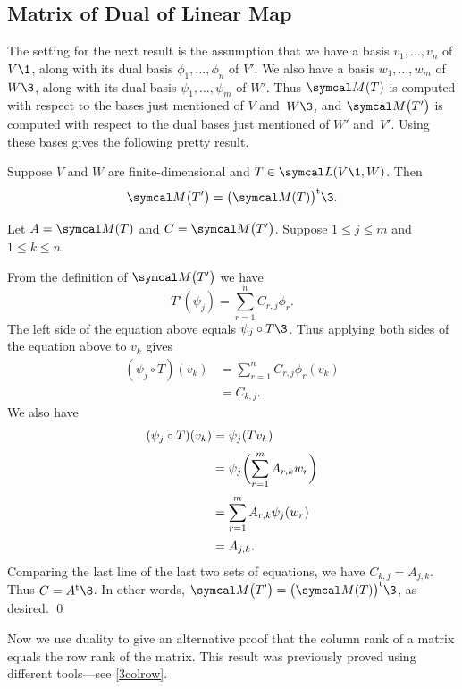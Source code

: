 \subsection{Matrix of Dual of Linear Map}

The setting for the next result is the assumption that we have a basis $v_1, \dots, v_n$ of $V\1$, along with its dual basis $\phi_1, \dots, \phi_n$ of $V'\!$. We also have a basis $w_1, \dots, w_m$ of $W\3$, along with its dual basis $\psi_1, \dots, \psi_m$ of $W'\!$. Thus $\M(T)$ is computed with respect to the bases just mentioned of $V$ and~$W\3$, and $\M\paren[\big]{T'}$ is computed with respect to the dual bases just mentioned of $W'$ and~$V'\!$. Using these bases gives the following pretty result.

{Suppose $V$ and $W$ are finite-dimensional and $T \in \L(V\1, W)$. Then
\[
\M\paren[\big]{T'} = \tran{\bigl(\M(T)\bigr)}\3.
\]}

\proof
Let $A = \M(T)$ and $C = \M\paren[\big]{T'}$. Suppose $1 \le j \le m$ and $1 \le k \le n$.

From the definition of $\M\paren[\big]{T'}$ we have
\[
T' \! (\psi_j) = \sum_{r=1}^n C_{r,j} \phi_r.
\]
The left side of the equation above equals $\psi_j \circ T\3$. Thus applying both sides of the equation above to $v_k$ gives
\begin{align*}
(\psi_j \circ T)(v_k) &= \sum_{r=1}^n C_{r,j} \phi_r(v_k)\\[2bp]
&= C_{k,j}.
\end{align*}
We also have
\begin{align*}
(\psi_j \circ T)(v_k) &= \psi_j(Tv_k) \\[2bp]
&= \psi_j\paren[\bigg]{ \sum_{r=1}^m A_{r,k} w_r }\\[2bp]
&= \sum_{r=1}^m A_{r,k} \psi_j(w_r) \\[2bp]
&= A_{j,k}.
\end{align*}
Comparing the last line of the last two sets of equations, we have $C_{k,j} = A_{j,k}$. Thus $C = \tran{A}\3$. In other words,
$\M\paren[\big]{T'} = \tran{\bigl(\M(T)\bigr)}\3$, as desired.
\qed

Now we use duality to give an alternative proof that the column rank of a matrix equals the row rank of the matrix. This result was previously proved using different tools---see \ref{3colrow}.


